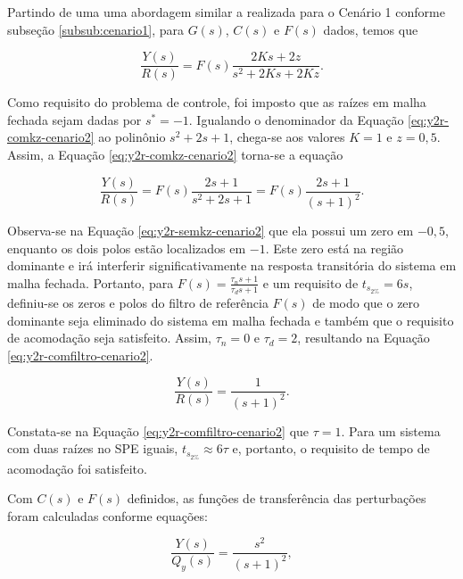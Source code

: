 Partindo de uma uma abordagem similar a realizada para o Cenário 1 conforme
subseção \ref{subsub:cenario1}, para $G(s)$, $C(s)$ e $F(s)$ dados, temos que

\begin{equation}
    \label{eq:y2r-comkz-cenario2}
    \frac{Y(s)}{R(s)} = F(s)\frac{2Ks + 2z}{s^2 + 2Ks + 2Kz}.
\end{equation}

Como requisito do problema de controle, foi imposto que as raízes em malha
fechada sejam dadas por $s^* = -1$. Igualando o denominador da Equação
\ref{eq:y2r-comkz-cenario2} ao polinônio $s^2 + 2s + 1$, chega-se aos valores
$K = 1$ e $z = 0,5$. Assim, a Equação \ref{eq:y2r-comkz-cenario2} torna-se 
a equação

\begin{equation}
    \label{eq:y2r-semkz-cenario2}
    \frac{Y(s)}{R(s)} = F(s)\frac{2s + 1}{s^2 + 2s + 1}
    = F(s)\frac{2s + 1}{(s+1)^2}.
\end{equation}

Observa-se na Equação \ref{eq:y2r-semkz-cenario2} que ela possui um zero em
$-0,5$, enquanto os dois polos estão localizados em $-1$. Este zero está na
região dominante e irá interferir significativamente na resposta transitória do
sistema em malha fechada. Portanto, para $F(s) = \frac{\tau_{n}s + 1}{\tau_{d}s
+ 1}$ e um requisito de $t_{s_{2\%}} = 6s$, definiu-se os zeros e polos do
filtro de referência $F(s)$ de modo que o zero dominante seja eliminado do
sistema em malha fechada e também que o requisito de acomodação seja satisfeito.
Assim, $\tau_{n} = 0$ e $\tau_{d} = 2$, resultando na Equação
\ref{eq:y2r-comfiltro-cenario2}.

\begin{equation}
    \label{eq:y2r-comfiltro-cenario2}
    \frac{Y(s)}{R(s)} = \frac{1}{(s+1)^2}.
\end{equation}

Constata-se na Equação \ref{eq:y2r-comfiltro-cenario2} que $\tau = 1$. Para um
sistema com duas raízes no SPE iguais, $t_{s_{2\%}} \approx 6\tau$ e, portanto,
o requisito de tempo de acomodação foi satisfeito.

Com $C(s)$ e $F(s)$ definidos, as funções de transferência das perturbações foram
calculadas conforme equações:

\begin{equation}
    \label{eq:y2qy-cenario2}
    \frac{Y(s)}{Q_{y}(s)} = \frac{s^2}{(s + 1)^2},
\end{equation}

